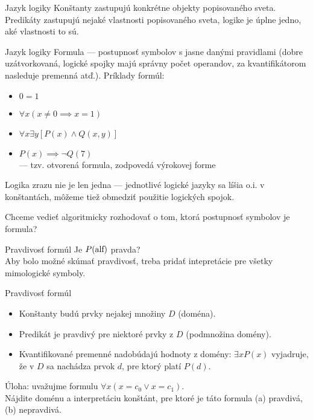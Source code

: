 \documentclass[12pt]{beamer}
\theoremstyle{definition}
\let\A\forall
\let\E\exists
\begin{document}
\begin{frame}{Jazyk logiky}
\alert{Konštanty} zastupujú konkrétne objekty popisovaného sveta.\\[5mm]
\pause
\alert{Predikáty} zastupujú nejaké vlastnosti popisovaného sveta, logike je úplne jedno, aké vlastnosti to sú.
\end{frame}

\begin{frame}{Jazyk logiky}
\alert{Formula} --- postupnosť symbolov s jasne danými pravidlami (dobre uzátvorkovaná, logické spojky majú správny počet operandov, za kvantifikátorom nasleduje premenná atď.).
\pause
Príklady formúl:
\begin{itemize}
	\item $0 = 1$
	\item $\A x (x \neq 0 \implies x = 1)$
	\item $\A x \E y [P(x) \land Q(x, y)]$
	\item $P(x) \implies \lnot Q(7)$\\ --- tzv. otvorená formula, zodpovedá výrokovej forme
\end{itemize}
\end{frame}

\begin{frame}
Logika zrazu nie je len jedna --- jednotlivé logické jazyky sa líšia o.i. v konštantách, môžeme tiež obmedziť použitie logických spojok.
\end{frame}

\begin{frame}
Chceme vedieť algoritmicky rozhodovať o tom, ktorá postupnosť symbolov je formula?
\end{frame}

\begin{frame}{Pravdivosť formúl}
Je $P(\hbox{alf})$ pravda?\\[5mm]
Aby bolo možné skúmať pravdivosť, treba pridať \alert{intepretácie} pre všetky mimologické symboly.
\end{frame}

\begin{frame}{Pravdivosť formúl}
\begin{itemize}
\item Konštanty budú prvky nejakej množiny $D$ (doména).
\pause
\item Predikát je pravdivý pre niektoré prvky z $D$ (podmnožina domény).
\pause
\item Kvantifikované premenné nadobúdajú hodnoty z domény:
	$\E x P(x)$ vyjadruje, že v $D$ sa nachádza prvok $d$, pre ktorý platí $P(d)$.
\end{itemize}
\pause
\vspace*{3mm}
Úloha: uvažujme formulu $\A x (x = c_0 \lor x = c_1)$.\\
Nájdite doménu a interpretáciu konštánt, pre ktoré je táto formula
(a) pravdivá, (b) nepravdivá.
\end{frame}
\end{document}
